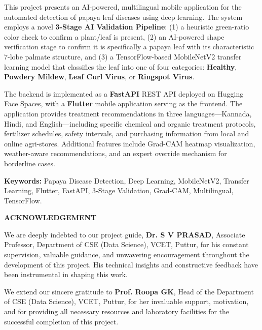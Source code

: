 \documentclass[12pt,a4paper]{report}
\begin{document}
\vspace{0.3cm}
This project presents an AI-powered, multilingual mobile application for the automated detection of papaya leaf diseases using deep learning. The system employs a novel \textbf{3-Stage AI Validation Pipeline}: (1) a heuristic green-ratio color check to confirm a plant/leaf is present, (2) an AI-powered shape verification stage to confirm it is specifically a papaya leaf with its characteristic 7-lobe palmate structure, and (3) a TensorFlow-based MobileNetV2 transfer learning model that classifies the leaf into one of four categories: \textbf{Healthy}, \textbf{Powdery Mildew}, \textbf{Leaf Curl Virus}, or \textbf{Ringspot Virus}.

\vspace{0.3cm}
The backend is implemented as a \textbf{FastAPI} REST API deployed on Hugging Face Spaces, with a \textbf{Flutter} mobile application serving as the frontend. The application provides treatment recommendations in three languages---Kannada, Hindi, and English---including specific chemical and organic treatment protocols, fertilizer schedules, safety intervals, and purchasing information from local and online agri-stores. Additional features include Grad-CAM heatmap visualization, weather-aware recommendations, and an expert override mechanism for borderline cases.

\vspace{0.3cm}
\textbf{Keywords:} Papaya Disease Detection, Deep Learning, MobileNetV2, Transfer Learning, Flutter, FastAPI, 3-Stage Validation, Grad-CAM, Multilingual, TensorFlow.

\newpage
\thispagestyle{plain}
\begin{center}
{\Large\bfseries ACKNOWLEDGEMENT}
\end{center}
\vspace{0.5cm}

We are deeply indebted to our project guide, \textbf{Dr. S V PRASAD}, Associate Professor, Department of CSE (Data Science), VCET, Puttur, for his constant supervision, valuable guidance, and unwavering encouragement throughout the development of this project. His technical insights and constructive feedback have been instrumental in shaping this work.

\vspace{0.3cm}
We extend our sincere gratitude to \textbf{Prof. Roopa GK}, Head of the Department of CSE (Data Science), VCET, Puttur, for her invaluable support, motivation, and for providing all necessary resources and laboratory facilities for the successful completion of this project.
\end{document}
